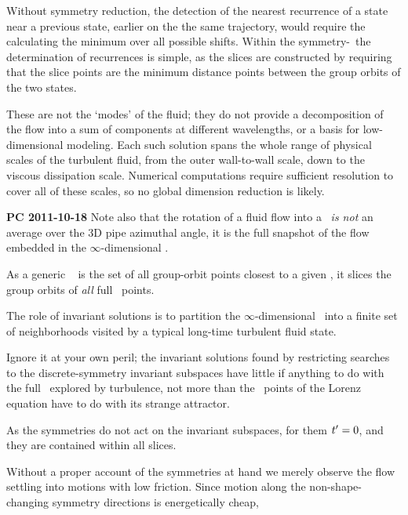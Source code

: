 Without symmetry reduction, the detection of the nearest recurrence of a
state near a previous state, earlier on the the same trajectory, would
require the calculating the minimum over all possible shifts. Within the
symmetry-\reducedsp\ the determination of recurrences is simple, as the
slices are constructed by requiring that the slice points are the minimum
distance points between the group orbits of the two states.

These are not the `modes' of the fluid; {they
do not provide a decomposition of the flow into a sum of components at
different wavelengths, or a basis for low-dimensional
modeling.} Each such solution spans the whole range of physical scales of
the turbulent fluid, from the outer wall-to-wall scale, down to the
viscous dissipation scale. Numerical computations require sufficient
resolution to cover all of these scales, so no {global} dimension
reduction is likely.

        {\bf PC 2011-10-18} Note also that the rotation of a fluid flow
        into a \slice\ {\em is not} an average over the 3D pipe azimuthal
        angle, it is the full snapshot of the flow embedded in the
        $\infty$-dimensional \statesp.

As a generic \slice\  is the set of all group-orbit
points closest to a given {\template}, it slices the group orbits of
\emph{all} full \statesp\ points.

The role of invariant solutions is
to partition the $\infty$-dimensional \statesp\ into a finite set of
neighborhoods visited by a typical long-time turbulent fluid state.

Ignore it at
your own peril; the invariant solutions found by restricting
searches to the discrete-symmetry invariant subspaces have little if
anything to do with the full \statesp\ explored by turbulence, not more
than the \eqv\ points of the Lorenz equation have to do with its strange
attractor.

 As the symmetries do not act on
the invariant subspaces, for them $t'_{} = 0$, and they are
contained within all slices.

Without a proper account of the
symmetries at hand we merely observe the flow settling into motions with
low friction. Since motion along the non-shape-changing symmetry
directions is energetically cheap,
